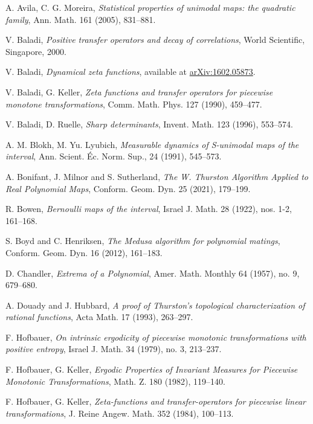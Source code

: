\documentclass[11pt]{amsart}
\begin{document}
\begin{thebibliography}{99}

A. Avila, C. G. Moreira, \emph{Statistical properties of unimodal maps: the quadratic family}, 
Ann. Math. 161 (2005), 831--881.

V. Baladi, \emph{Positive transfer operators and decay of correlations}, 
World Scientific, Singapore, 2000.

V. Baladi, \emph{Dynamical zeta functions},
available at \url{arXiv:1602.05873}. 

V. Baladi, G. Keller, 
\emph{Zeta functions and transfer operators for piecewise monotone transformations},
Comm. Math. Phys. 127 (1990), 459--477.

V. Baladi, D. Ruelle,  \emph{Sharp determinants}, 
Invent. Math. 123 (1996), 553--574.

A. M. Blokh, M. Yu. Lyubich, \emph{Measurable dynamics of S-unimodal maps of the interval}, 
Ann. Scient. \'Ec. Norm. Sup., 24 (1991), 545--573.

A. Bonifant, J. Milnor and S. Sutherland, 
\emph{The W. Thurston Algorithm Applied to Real Polynomial Maps}, 
Conform. Geom. Dyn. 25 (2021), 179--199. 

R. Bowen, \emph{Bernoulli maps of the interval}, 
Israel J. Math. 28 (1922), nos. 1-2, 161--168. 

S. Boyd and C. Henriksen, \emph{The Medusa algorithm for polynomial matings}, 
Conform. Geom. Dyn. 16 (2012), 161--183.

D. Chandler, \emph{Extrema of a Polynomial}, 
Amer. Math. Monthly 64 (1957), no. 9, 679--680.

A. Douady and J. Hubbard, \emph{A proof of Thurston's topological characterization of rational functions}, 
Acta Math. 17 (1993), 263--297.

F. Hofbauer, 
\emph{On intrinsic ergodicity of piecewise monotonic transformations with positive entropy}, 
Israel J. Math. 34 (1979), no. 3, 213--237.

F. Hofbauer, G. Keller, 
\emph{Ergodic Properties of Invariant Measures for Piecewise Monotonic Transformations}, 
Math. Z. 180 (1982), 119--140.

F. Hofbauer, G. Keller, 
\emph{Zeta-functions and transfer-operators for piecewise linear transformations}, 
J. Reine Angew. Math. 352 (1984), 100--113.


\end{thebibliography}
\end{document}
